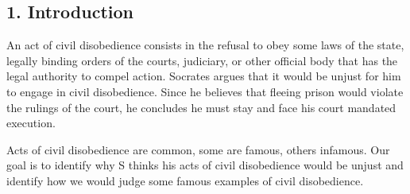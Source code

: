 \documentclass[oneside]{article}
\begin{document}
\subsection*{1. Introduction}

An act of civil disobedience consists in the refusal to obey some laws of the state, legally binding orders of the courts, judiciary, or other official body that has the  legal authority to compel action. Socrates argues that it would be unjust for him to engage in civil disobedience. Since he believes that fleeing prison would violate the rulings of the court, he concludes he must stay and face his court mandated execution.

Acts of civil disobedience are common, some are famous, others infamous. Our goal is to identify why S thinks his acts of civil disobedience would be unjust and identify how we would judge some famous examples of civil disobedience. 
\end{document}
